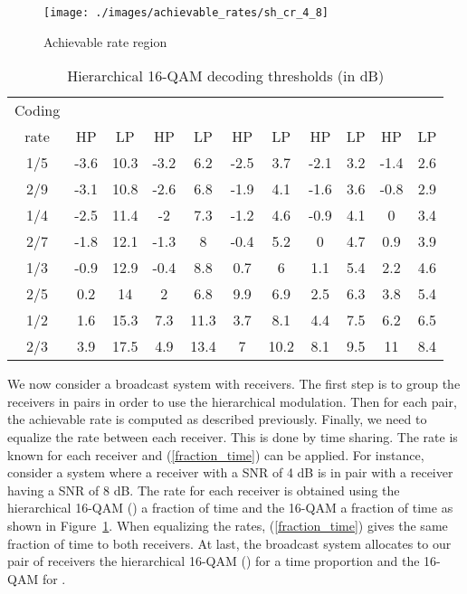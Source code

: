 \documentclass[conference, letterpaper]{IEEEtran}
\begin{document}
\begin{figure}[!ht]
\centering
\texttt{[image: ./images/achievable\_rates/sh\_cr\_4\_8]}
\caption{Achievable rate region}
\label{sh_cr_4_8}
\end{figure}

\begin{table}[!ht]
\renewcommand{\arraystretch}{1.1}
\setlength{\tabcolsep}{0.13cm}
\caption{Hierarchical 16-QAM decoding thresholds (in dB)}
\label{decoding_threshold}
\centering
\begin{tabular}{c||c|c|c|c|c|c|c|c|c|c} 
\hline
Coding & \multicolumn{2}{c|}{} & \multicolumn{2}{c|}{} & \multicolumn{2}{c|}{} &  \multicolumn{2}{c|}{} & \multicolumn{2}{c}{} \\ 
\cline{2-11}
rate & HP & LP & HP & LP & HP & LP & HP & LP & HP & LP \\
\hline
1/5 & -3.6 & 10.3 & -3.2 & 6.2 & -2.5 & 3.7 & -2.1 & 3.2 & -1.4 & 2.6 \\
\hline
2/9 & -3.1 & 10.8 & -2.6 & 6.8 & -1.9 & 4.1 & -1.6 & 3.6 & -0.8 & 2.9 \\
\hline 
1/4 & -2.5 & 11.4 & -2 & 7.3 & -1.2 & 4.6 & -0.9 & 4.1 & 0 & 3.4 \\
\hline 
2/7 & -1.8 & 12.1 & -1.3 & 8 & -0.4 & 5.2 & 0 & 4.7 & 0.9 & 3.9 \\
\hline 
1/3 & -0.9 & 12.9 & -0.4 & 8.8 & 0.7 & 6 & 1.1 & 5.4 & 2.2 & 4.6 \\
\hline 
2/5 & 0.2 & 14 & 2 & 6.8 & 9.9 & 6.9 & \cellcolor{Gray} 2.5 & 6.3 & \cellcolor{Gray} 3.8 & 5.4 \\
\hline 
1/2 & 1.6 & 15.3 & 7.3 & 11.3 & 3.7 & 8.1 & 4.4 & \cellcolor{Gray} 7.5 & 6.2 & \cellcolor{Gray} 6.5 \\
\hline 
2/3 & 3.9 & 17.5 & 4.9 & 13.4 & 7 & 10.2 & 8.1 & 9.5 & 11 & 8.4 \\
\hline   
\end{tabular}
\end{table}

We now consider a broadcast system with  receivers. The first step is to group the receivers in pairs in order to use the hierarchical modulation. Then for each pair, the achievable rate is computed as described previously. Finally, we need to equalize the rate between each receiver. This is done by time sharing. The rate is known for each receiver and (\ref{fraction_time}) can be applied. For instance, consider a system where a receiver with a SNR of 4 dB is in pair with a receiver having a SNR of 8 dB. The rate for each receiver is obtained using the hierarchical 16-QAM () a fraction of time  and the 16-QAM a fraction of time  as shown in Figure~\ref{sh_cr_4_8}. When equalizing the rates, (\ref{fraction_time}) gives the same fraction of time  to both receivers. At last, the broadcast system allocates to our pair of receivers the hierarchical 16-QAM () for a time proportion  and the 16-QAM for . 
\end{document}
